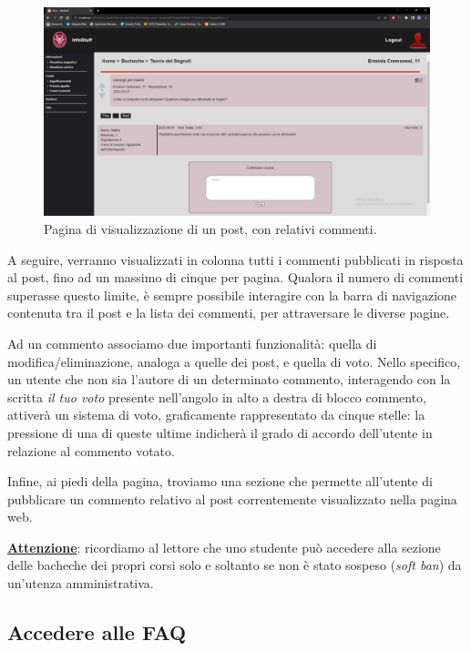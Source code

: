 \documentclass [a4paper,11pt]{book}
\begin{document}
\begin{figure}
\centering
\includegraphics[scale=0.3]{figura2-18.png}
\caption{Pagina di visualizzazione di un post, con relativi commenti.}
\end{figure}

A seguire, verranno visualizzati in colonna tutti i commenti pubblicati in risposta al post, fino ad un massimo di cinque per pagina. Qualora il numero di commenti superasse questo limite, è sempre possibile interagire con la barra di navigazione contenuta tra il post e la lista dei commenti, per attraversare le diverse pagine. 

Ad un commento associamo due importanti funzionalità: quella di modifica/eliminazione, analoga a quelle dei post, e quella di voto. Nello specifico, un utente che non sia l'autore di un determinato commento, interagendo con la scritta \emph{il tuo voto} presente nell'angolo in alto a destra di blocco commento, attiverà un sistema di voto, graficamente rappresentato da cinque stelle: la pressione di una di queste ultime indicherà il grado di accordo dell'utente in relazione al commento votato.

Infine, ai piedi della pagina, troviamo una sezione che permette all'utente di pubblicare un commento relativo al post correntemente visualizzato nella pagina web.

\medskip

\textbf{\underline{Attenzione}}: ricordiamo al lettore che uno studente può accedere alla sezione delle bacheche dei propri corsi solo e soltanto se non è stato sospeso (\emph{soft ban}) da un'utenza amministrativa.

\medskip

\subsection{Accedere alle FAQ}
\end{document}
